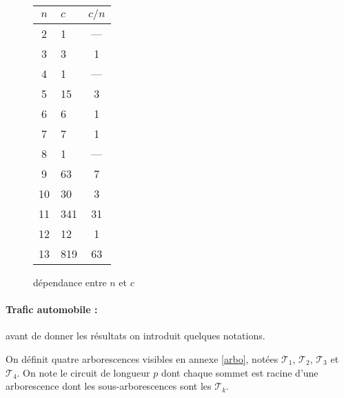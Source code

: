 \begin{figure}[!]
\begin{center}
 \begin{tabular}{||c  l  c||} 
 \hline
 $n$ & $c$ & $c/n$ \\ [0.5ex] 
 \hline
 2 & 1 & ---\\ 
 \hline
 3 & 3 & 1\\ 
 \hline
 4 & 1 & ---\\ 
 \hline
 5 & 15 & 3\\ 
 \hline
 6 & 6 & 1\\ 
 \hline
 7 & 7 & 1\\ 
 \hline
 8 & 1 & ---\\ 
 \hline
 9 & 63 & 7\\ 
 \hline
 10 & 30 & 3\\ 
 \hline
 11 & 341 & 31\\ 
 \hline
 12 & 12 & 1\\ 
 \hline
 13 & 819 & 63\\ 
\hline
\end{tabular}
\end{center}
\caption{d\'ependance entre $n$ et $c$}\label{tablincyc2}
\end{figure}


\paragraph{Trafic automobile :}avant de donner les r\'esultats on introduit quelques notations.

\begin{definition}
On d\'efinit quatre arborescences visibles en annexe \ref{arbo}, not\'ees $\mathcal{T}_1$, $\mathcal{T}_2$, $\mathcal{T}_3$ et $\mathcal{T}_4$.
On note  le circuit de longueur $p$ dont chaque sommet est racine d'une arborescence dont les sous-arborescences sont les $\mathcal{T}_k$.
\end{definition}

